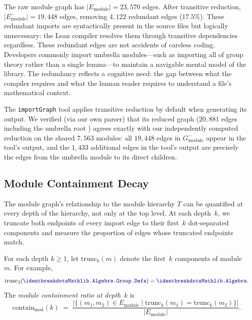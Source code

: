 The raw module graph has $|E_{\mathrm{module}}| = 23{,}570$ edges. After transitive reduction, $|E_{\mathrm{module}}^{-}| = 19{,}448$ edges, removing $4{,}122$ redundant edges ($17.5\%$). These redundant imports are syntactically present in the source files but logically unnecessary: the Lean compiler resolves them through transitive dependencies regardless. These redundant edges are not accidents of careless coding. Developers commonly import umbrella modules---such as importing all of group theory rather than a single lemma---to maintain a navigable mental model of the library. The redundancy reflects a cognitive need: the gap between what the compiler requires and what the human reader requires to understand a file's mathematical context.

The \texttt{importGraph} tool applies transitive reduction by default when generating its output. We verified (via our own parser) that its reduced graph ($20{,}881$ edges including the umbrella root ) agrees exactly with our independently computed reduction on the shared $7{,}563$ modules: all $19{,}448$ edges in $G_{\mathrm{module}}^{-}$ appear in the tool's output, and the $1{,}433$ additional edges in the tool's output are precisely the edges from the umbrella module  to its direct children.

\subsection{Module Containment Decay}
\label{sec:module-containment}

The module graph's relationship to the module hierarchy $T$ can be quantified at every depth of the hierarchy, not only at the top level. At each depth~$k$, we truncate both endpoints of every import edge to their first~$k$ dot-separated components and measure the proportion of edges whose truncated endpoints match.

\begin{definition}
\label{def:module-containment}
For each depth $k \ge 1$, let $\mathrm{trunc}_k(m)$ denote the first~$k$ components of module~$m$. For example,
\[
  \mathrm{trunc}_2(\module{Mathlib.Algebra.Group.Defs}) = \module{Mathlib.Algebra}.
\]
The \emph{module containment ratio at depth~$k$} is
\[
  \mathrm{contain}_{\mathrm{mod}}(k) \;=\; \frac{|\{(m_1,m_2) \in E_{\mathrm{module}} \mid \mathrm{trunc}_k(m_1) = \mathrm{trunc}_k(m_2)\}|}{|E_{\mathrm{module}}|}.
\]
\end{definition}

